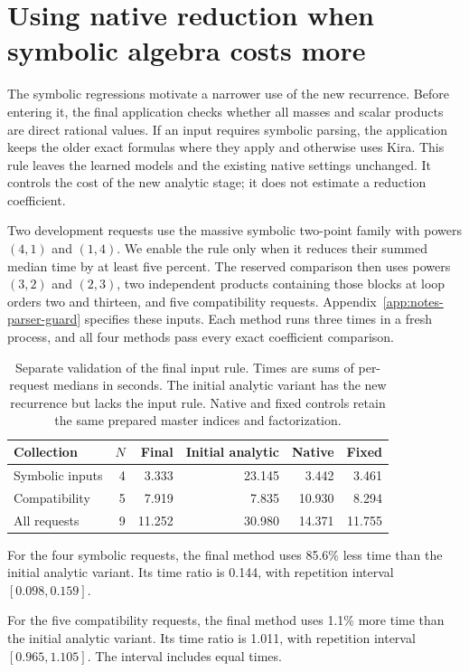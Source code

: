 \section{Using native reduction when symbolic algebra costs more}
\label{sec:notes-parser-guard}
The symbolic regressions motivate a narrower use of the new recurrence. Before entering it, the final application checks whether all masses and scalar products are direct rational values. If an input requires symbolic parsing, the application keeps the older exact formulas where they apply and otherwise uses Kira. This rule leaves the learned models and the existing native settings unchanged. It controls the cost of the new analytic stage; it does not estimate a reduction coefficient.

Two development requests use the massive symbolic two-point family with powers $(4,1)$ and $(1,4)$. We enable the rule only when it reduces their summed median time by at least five percent. The reserved comparison then uses powers $(3,2)$ and $(2,3)$, two independent products containing those blocks at loop orders two and thirteen, and five compatibility requests. Appendix~\ref{app:notes-parser-guard} specifies these inputs. Each method runs three times in a fresh process, and all four methods pass every exact coefficient comparison.

\begin{table}[!htbp]\centering\small
\caption{Separate validation of the final input rule. Times are sums of per-request medians in seconds. The initial analytic variant has the new recurrence but lacks the input rule. Native and fixed controls retain the same prepared master indices and factorization.}
\label{tab:notes-parser-guard}
\begin{tabular}{@{}lrrrrr@{}}\toprule
Collection & $N$ & Final & Initial analytic & Native & Fixed\\\midrule
Symbolic inputs & 4 & 3.333 & 23.145 & 3.442 & 3.461 \\
Compatibility & 5 & 7.919 & 7.835 & 10.930 & 8.294 \\
All requests & 9 & 11.252 & 30.980 & 14.371 & 11.755 \\
\bottomrule\end{tabular}\end{table}

For the four symbolic requests, the final method uses 85.6\% less time than the initial analytic variant. Its time ratio is 0.144, with repetition interval $[0.098,0.159]$.

For the five compatibility requests, the final method uses 1.1\% more time than the initial analytic variant. Its time ratio is 1.011, with repetition interval $[0.965,1.105]$. The interval includes equal times.

